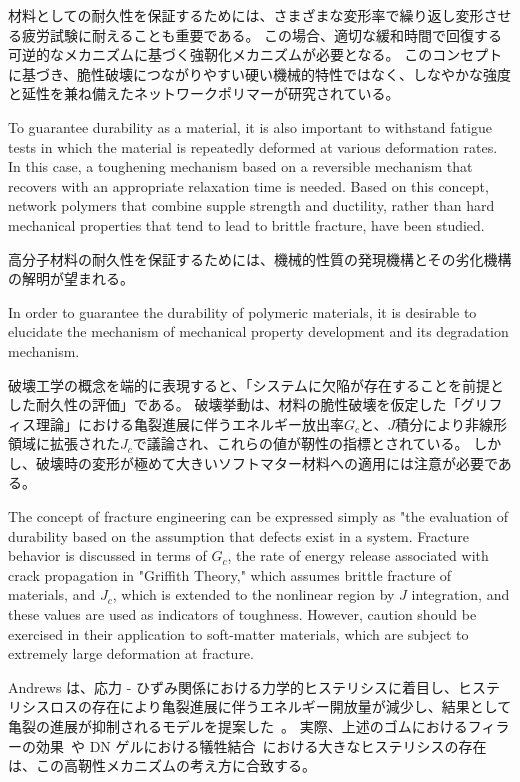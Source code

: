 \documentclass[uplatex,dvipdfmx,a4paper,10pt]{jsarticle}
\makeatletter
\def\subsection{\@startsection{subsection}{2}{\z@}{0.2\Cvs \@plus.5\Cdp \@minus.2\Cdp}{0.1\Cvs \@plus.3\Cdp}{\reset@font\normalsize\bfseries}}
\makeatother
\begin{document}
材料としての耐久性を保証するためには、さまざまな変形率で繰り返し変形させる疲労試験に耐えることも重要である。
この場合、適切な緩和時間で回復する可逆的なメカニズムに基づく強靭化メカニズムが必要となる。
このコンセプトに基づき、脆性破壊につながりやすい硬い機械的特性ではなく、しなやかな強度と延性を兼ね備えたネットワークポリマーが研究されている。

To guarantee durability as a material, it is also important to withstand fatigue tests in which the material is repeatedly deformed at various deformation rates.
In this case, a toughening mechanism based on a reversible mechanism that recovers with an appropriate relaxation time is needed.
Based on this concept, network polymers that combine supple strength and ductility, rather than hard mechanical properties that tend to lead to brittle fracture, have been studied.



\subsection{力学的ヒステリシスの重要性}

高分子材料の耐久性を保証するためには、機械的性質の発現機構とその劣化機構の解明が望まれる。

In order to guarantee the durability of polymeric materials, it is desirable to elucidate the mechanism of mechanical property development and its degradation mechanism.

破壊工学の概念を端的に表現すると、「システムに欠陥が存在することを前提とした耐久性の評価」である。
破壊挙動は、材料の脆性破壊を仮定した「グリフィス理論」における亀裂進展に伴うエネルギー放出率$G_c$と、$J$積分により非線形領域に拡張された$J_c$で議論され、これらの値が靭性の指標とされている。
しかし、破壊時の変形が極めて大きいソフトマター材料への適用には注意が必要である。

The concept of fracture engineering can be expressed simply as "the evaluation of durability based on the assumption that defects exist in a system.
Fracture behavior is discussed in terms of $G_c$, the rate of energy release associated with crack propagation in "Griffith Theory," which assumes brittle fracture of materials, and $J_c$, which is extended to the nonlinear region by $J$ integration, and these values are used as indicators of toughness.
However, caution should be exercised in their application to soft-matter materials, which are subject to extremely large deformation at fracture.

Andrews は、応力 - ひずみ関係における力学的ヒステリシスに着目し、ヒステリシスロスの存在により亀裂進展に伴うエネルギー開放量が減少し、結果として亀裂の進展が抑制されるモデルを提案した~\cite{Andrews1977}。
実際、上述のゴムにおけるフィラーの効果~\cite{Igarashi2013}や DN ゲルにおける犠牲結合~\cite{Gong2010}における大きなヒステリシスの存在は、この高靭性メカニズムの考え方に合致する。
\end{document}
